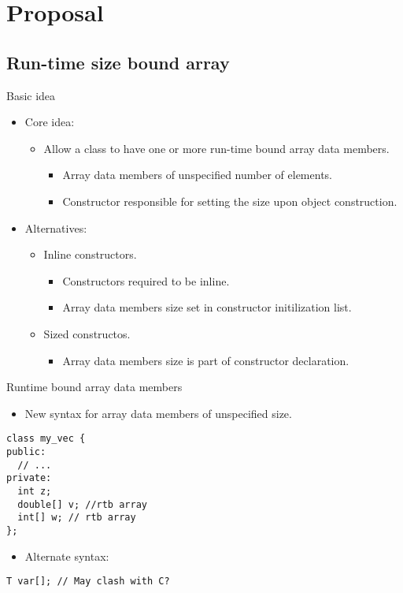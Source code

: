 \section{Proposal}

\subsection{Run-time size bound array}

\begin{frame}[t]{Basic idea}
\begin{itemize}[<+->]
  \item Core idea:
    \begin{itemize}
      \item Allow a class to have one or more run-time bound array data members.
        \begin{itemize}
          \item Array data members of unspecified number of elements.
          \item Constructor responsible for setting the size upon object construction.
        \end{itemize}
    \end{itemize}
  \item Alternatives:
    \begin{itemize}
      \item Inline constructors.
        \begin{itemize}
          \item Constructors required to be inline.
          \item Array data members size set in constructor initilization list.
        \end{itemize}
      \item Sized constructos.
        \begin{itemize}
          \item Array data members size is part of constructor declaration.
        \end{itemize}
    \end{itemize}
\end{itemize}
\end{frame}

\begin{frame}[t,fragile]{Runtime bound array data members}
  \begin{itemize}
    \item New syntax for array data members of unspecified size.
  \end{itemize}
\pause
\begin{lstlisting}[style=cpp11]
class my_vec {
public:
  // ...
private:
  int z;
  double[] v; //rtb array
  int[] w; // rtb array
};
\end{lstlisting}
  \begin{itemize}
    \item Alternate syntax:
  \end{itemize}
\begin{lstlisting}[style=cpp11]
T var[]; // May clash with C?
\end{lstlisting}
\end{frame}


